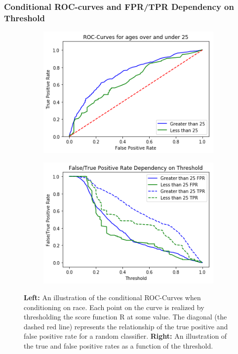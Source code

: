 \documentclass[11pt, fleqn, titlepage]{article}
\begin{document}
	
	\subsubsection{Conditional ROC-curves and FPR/TPR Dependency on Threshold}
	
	\begin{figure}[H]
		\centering
		\begin{subfigure}{0.5\textwidth}
			\centering
			\includegraphics[width=0.9\linewidth]{imgs/ROC_age.png}
		\end{subfigure}%
		\begin{subfigure}{0.5\textwidth}
			\centering
			\includegraphics[width=0.9\linewidth]{imgs/fpr_tpr_plot_age.png}
		\end{subfigure}
		\caption{\textbf{Left:} An illustration of the conditional ROC-Curves when conditioning on race. Each point on the curve is realized by thresholding the score function R at some value. The diagonal (the dashed red line) represents the relationship of the true positive and false positive rate for a random classifier. \textbf{Right:} An illustration of the true and false positive rates as a function of the threshold.}
		\label{fig:roc-curveage}
	\end{figure}
	
\end{document}

